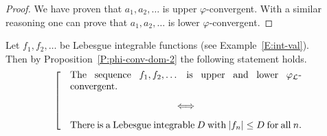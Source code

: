 \documentclass[main.tex]{subfiles}
\begin{document}
\begin{proof}
We have proven that $a_1,a_2,\dotsc$ 
is upper $\varphi$-convergent.
With a similar reasoning one can prove that
$a_1,a_2,\dotsc$
is lower $\varphi$-convergent.
\end{proof}







\begin{ex}
\label{E:seq-phi-conv}
Let $f_1,f_2,\dotsc$ be  Lebesgue integrable functions
(see Example~\ref{E:int-val}). \\
Then by Proposition~\ref{P:phi-conv-dom-2}
the following statement holds.
\begin{equation*}
\left[\quad
\begin{minipage}{.7\columnwidth}
 The sequence $f_1,f_2,\dotsc$
is  upper and lower $\Lphi$-convergent.
\begin{center}
$\Longleftrightarrow$
\end{center}
There is a Lebesgue integrable~$D$ with $|f_n| \leq D$ for all~$n$.
\end{minipage}
\right.
\end{equation*}
\end{ex}
\vspace{.3em}
\end{document}
